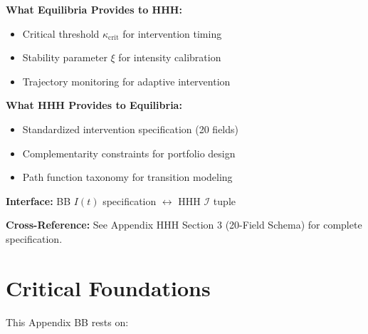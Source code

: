 \documentclass[11pt, a4paper]{article}
\begin{document}
\begin{tcolorbox}[colback=orange!5!white, colframe=orange!75!black,
    title=\textbf{Integration: Equilibria $\leftrightarrow$ HHH (Intervention Toolkit)}]
\textbf{What Equilibria Provides to HHH:}
\begin{itemize}[nosep]
\item Critical threshold $\kappa_{\text{crit}}$ for intervention timing
\item Stability parameter $\xi$ for intensity calibration
\item Trajectory monitoring for adaptive intervention
\end{itemize}

\textbf{What HHH Provides to Equilibria:}
\begin{itemize}[nosep]
\item Standardized intervention specification (20 fields)
\item Complementarity constraints for portfolio design
\item Path function taxonomy for transition modeling
\end{itemize}

\textbf{Interface:} BB $I(t)$ specification $\leftrightarrow$ HHH $\mathcal{I}$ tuple

\textbf{Cross-Reference:} See Appendix HHH Section 3 (20-Field Schema) for complete specification.

\end{tcolorbox}


\section{Critical Foundations}

This Appendix BB rests on:
\end{document}
